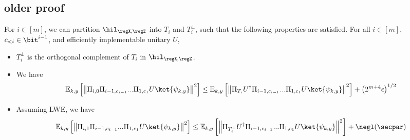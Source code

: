 \subsection{older proof}
\begin{lemma}
For $i\in [m]$, we can partition $\hil_{\regX,\regZ}$ into $T_{i}$ and $T_{i}^{\bot}$, such that the following properties are satisfied. 
For all $i\in[m]$, $c_{<i}\in \bit^{i-1}$, and efficiently implementable unitary $U$,
\begin{itemize}
    \item $T_{i}^{\bot}$ is the orthogonal complement of $T_{i}$ in $\hil_{\regX,\regZ}$.

    \item We have 
    \begin{align*}
     \mathbb{E}_{k,y}\left[\left\|\Pi_{i,0}\Pi_{i-1,c_{i-1}}...\Pi_{1,c_1}U\ket{\psi_{k,y}}\right\|^2\right]\leq   \mathbb{E}_{k,y}\left[\left\|\Pi_{T_{i}}U^{\dagger}\Pi_{i-1,c_{i-1}}...\Pi_{1,c_1}U\ket{\psi_{k,y}}\right\|^{2}\right]+\left(2^{m+4}\epsilon\right)^{1/2}
    \end{align*}
    
     \item Assuming LWE, we have 
    \begin{align*}
     \mathbb{E}_{k,y}\left[\left\|\Pi_{i,1}\Pi_{i-1,c_{i-1}}...\Pi_{1,c_1}U\ket{\psi_{k,y}}\right\|^{2}\right]\leq   \mathbb{E}_{k,y}\left[\left\|\Pi_{T_{i}^{\bot}}U^{\dagger}\Pi_{i-1,c_{i-1}}...\Pi_{1,c_1}U\ket{\psi_{k,y}}\right\|^{2}\right]+\negl(\secpar)
    \end{align*}
\end{itemize}
\end{lemma}
